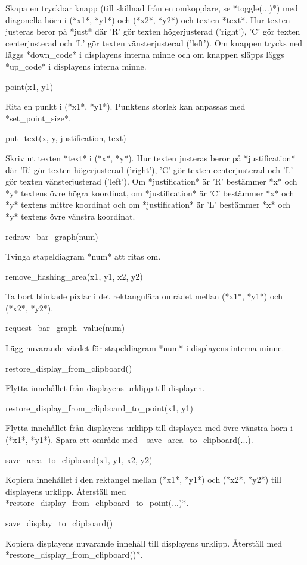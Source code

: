 Skapa en tryckbar knapp (till skillnad från en omkopplare, se
*toggle(...)*) med diagonella hörn i (*x1*, *y1*) och (*x2*, *y2*) och
texten *text*. Hur texten justeras beror på *just* där 'R' gör texten
högerjusterad ('right'), 'C' gör texten centerjusterad och 'L' gör
texten vänsterjusterad ('left'). Om knappen trycks ned läggs
*down\_code* i displayens interna minne och om knappen släpps läggs
*up\_code* i displayens interna minne.

point(x1, y1)

Rita en punkt i (*x1*, *y1*). Punktens storlek kan anpassas med
*set\_point\_size*.

put\_text(x, y, justification, text)

Skriv ut texten *text* i (*x*, *y*). Hur texten justeras beror på
*justification* där 'R' gör texten högerjusterad ('right'), 'C' gör
texten centerjusterad och 'L' gör texten vänsterjusterad ('left'). Om
*justification* är 'R' bestämmer *x* och *y* textens övre högra
koordinat, om *justification* är 'C' bestämmer *x* och *y* textens
mittre koordinat och om *justification* är 'L' bestämmer *x* och *y*
textens övre vänstra koordinat.

redraw\_bar\_graph(num)

Tvinga stapeldiagram *num* att ritas om.

remove\_flashing\_area(x1, y1, x2, y2)

Ta bort blinkade pixlar i det rektangulära området mellan (*x1*, *y1*)
och (*x2*, *y2*).

request\_bar\_graph\_value(num)

Lägg nuvarande värdet för stapeldiagram *num* i displayens interna
minne.

restore\_display\_from\_clipboard()

Flytta innehållet från displayens urklipp till displayen.

restore\_display\_from\_clipboard\_to\_point(x1, y1)

Flytta innehållet från displayens urklipp till displayen med övre
vänstra hörn i (*x1*, *y1*). Spara ett område med
\_save\_area\_to\_clipboard(...).

save\_area\_to\_clipboard(x1, y1, x2, y2)

Kopiera innehållet i den rektangel mellan (*x1*, *y1*) och (*x2*, *y2*)
till displayens urklipp. Återställ med
*restore\_display\_from\_clipboard\_to\_point(...)*.

save\_display\_to\_clipboard()

Kopiera displayens nuvarande innehåll till displayens urklipp. Återställ
med *restore\_display\_from\_clipboard()*.

